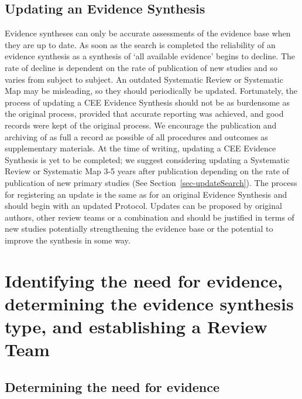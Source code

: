 \documentclass[
  letterpaper,
  DIV=11,
  numbers=noendperiod]{scrreprt}
\begin{document}
\section{\texorpdfstring{\textbf{Updating an Evidence
Synthesis}}{Updating an Evidence Synthesis}}\label{sec-update1}

Evidence syntheses can only be accurate assessments of the evidence base
when they are up to date. As soon as the search is completed the
reliability of an evidence synthesis as a synthesis of `all available
evidence' begins to decline. The rate of decline is dependent on the
rate of publication of new studies and so varies from subject to
subject. An outdated Systematic Review or Systematic Map may be
misleading, so they should periodically be updated. Fortunately, the
process of updating a CEE Evidence Synthesis should not be as burdensome
as the original process, provided that accurate reporting was achieved,
and good records were kept of the original process. We encourage the
publication and archiving of as full a record as possible of all
procedures and outcomes as supplementary materials. At the time of
writing, updating a CEE Evidence Synthesis is yet to be completed; we
suggest considering updating a Systematic Review or Systematic Map 3-5
years after publication depending on the rate of publication of new
primary studies (See Section~\ref{sec-updateSearch}). The process for
registering an update is the same as for an original Evidence Synthesis
and should begin with an updated Protocol. Updates can be proposed by
original authors, other review teams or a combination and should be
justified in terms of new studies potentially strengthening the evidence
base or the potential to improve the synthesis in some way.


\chapter{Identifying the need for evidence, determining the evidence
synthesis type, and establishing a Review
Team}\label{identifying-the-need-for-evidence-determining-the-evidence-synthesis-type-and-establishing-a-review-team}

\section{\texorpdfstring{\textbf{Determining the need for
evidence}}{Determining the need for evidence}}\label{sec-chapt2}
\end{document}

